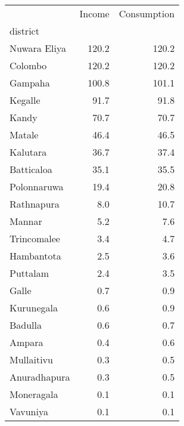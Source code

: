 \begin{tabular}{lrr}
\toprule
{} &  Income &  Consumption \\
district     &         &              \\
\midrule
Nuwara Eliya &   120.2 &        120.2 \\
Colombo      &   120.2 &        120.2 \\
Gampaha      &   100.8 &        101.1 \\
Kegalle      &    91.7 &         91.8 \\
Kandy        &    70.7 &         70.7 \\
Matale       &    46.4 &         46.5 \\
Kalutara     &    36.7 &         37.4 \\
Batticaloa   &    35.1 &         35.5 \\
Polonnaruwa  &    19.4 &         20.8 \\
Rathnapura   &     8.0 &         10.7 \\
Mannar       &     5.2 &          7.6 \\
Trincomalee  &     3.4 &          4.7 \\
Hambantota   &     2.5 &          3.6 \\
Puttalam     &     2.4 &          3.5 \\
Galle        &     0.7 &          0.9 \\
Kurunegala   &     0.6 &          0.9 \\
Badulla      &     0.6 &          0.7 \\
Ampara       &     0.4 &          0.6 \\
Mullaitivu   &     0.3 &          0.5 \\
Anuradhapura &     0.3 &          0.5 \\
Moneragala   &     0.1 &          0.1 \\
Vavuniya     &     0.1 &          0.1 \\
\bottomrule
\end{tabular}
